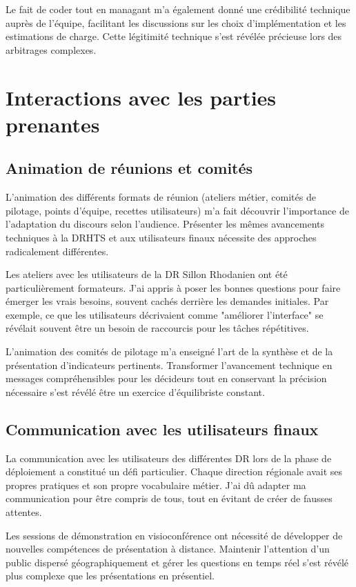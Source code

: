 Le fait de coder tout en managant m'a également donné une crédibilité technique auprès de l'équipe, facilitant les discussions sur les choix d'implémentation et les estimations de charge.
Cette légitimité technique s'est révélée précieuse lors des arbitrages complexes.


\section{Interactions avec les parties prenantes}

\subsection{Animation de réunions et comités}
L'animation des différents formats de réunion (ateliers métier, comités de pilotage, points d'équipe, recettes utilisateurs) m'a fait découvrir l'importance de l'adaptation du discours selon l'audience.
Présenter les mêmes avancements techniques à la DRHTS et aux utilisateurs finaux nécessite des approches radicalement différentes.

Les ateliers avec les utilisateurs de la DR Sillon Rhodanien ont été particulièrement formateurs.
J'ai appris à poser les bonnes questions pour faire émerger les vrais besoins, souvent cachés derrière les demandes initiales.
Par exemple, ce que les utilisateurs décrivaient comme "améliorer l'interface" se révélait souvent être un besoin de raccourcis pour les tâches répétitives.

L'animation des comités de pilotage m'a enseigné l'art de la synthèse et de la présentation d'indicateurs pertinents.
Transformer l'avancement technique en messages compréhensibles pour les décideurs tout en conservant la précision nécessaire s'est révélé être un exercice d'équilibriste constant.

\subsection{Communication avec les utilisateurs finaux}
La communication avec les utilisateurs des différentes DR lors de la phase de déploiement a constitué un défi particulier.
Chaque direction régionale avait ses propres pratiques et son propre vocabulaire métier.
J'ai dû adapter ma communication pour être compris de tous, tout en évitant de créer de fausses attentes.

Les sessions de démonstration en visioconférence ont nécessité de développer de nouvelles compétences de présentation à distance.
Maintenir l'attention d'un public dispersé géographiquement et gérer les questions en temps réel s'est révélé plus complexe que les présentations en présentiel.

